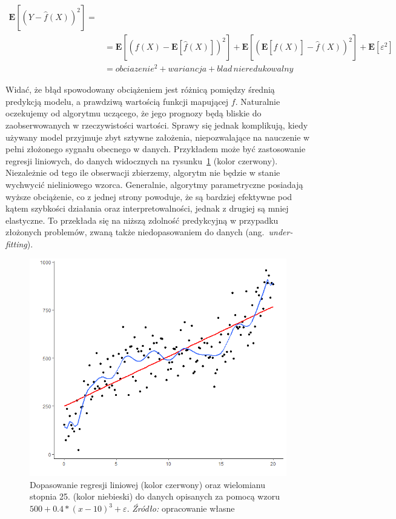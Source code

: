 \documentclass[12pt,a4paper,twoside,openany]{book}
\begin{document}
\begin{equation} \label{wzor9f}
\begin{split}
\mathbf{E}[(Y - \hat{f}(X))^{2}] = \\
&= \mathbf{E}[(f(X) - \mathbf{E}[\hat{f}(X)])^{2}] + \mathbf{E}[(\mathbf{E}[\hat{f}(X)] - \hat{f}(X))^{2}] + \mathbf{E}[\varepsilon^{2}] \\
&= obciazenie^{2} + wariancja + blad\, nieredukowalny
\end{split}
\end{equation}


Widać, że błąd spowodowany obciążeniem jest różnicą pomiędzy średnią predykcją modelu, a prawdziwą wartością funkcji mapującej $f$. Naturalnie oczekujemy od algorytmu uczącego, że jego prognozy będą bliskie do zaobserwowanych w rzeczywistości wartości. Sprawy się jednak komplikują, kiedy używany model przyjmuje zbyt sztywne założenia, niepozwalające na nauczenie w pełni złożonego sygnału obecnego w danych. Przykładem może być zastosowanie regresji liniowych, do danych widocznych na rysunku~\ref{rys008} (kolor czerwony). Niezależnie od tego ile obserwacji zbierzemy, algorytm nie będzie w stanie wychwycić nieliniowego wzorca. Generalnie, algorytmy parametryczne posiadają wyższe obciążenie, co z jednej strony powoduje, że są bardziej efektywne pod kątem szybkości działania oraz interpretowalności, jednak z drugiej są mniej elastyczne. To przekłada się na niższą zdolność predykcyjną w przypadku złożonych problemów, zwaną także niedopasowaniem do danych (ang.~\textit{under-fitting}).

\begin{figure}
\centering
\includegraphics[scale=0.75]{./rys008}
\caption{Dopasowanie regresji liniowej (kolor czerwony) oraz wielomianu stopnia 25. (kolor niebieski) do danych opisanych za pomocą wzoru $500 + 0.4 * (x-10)^3 + \varepsilon$. \textit{Źródło:} opracowanie własne}\label{rys008}
\end{figure}
\end{document}
